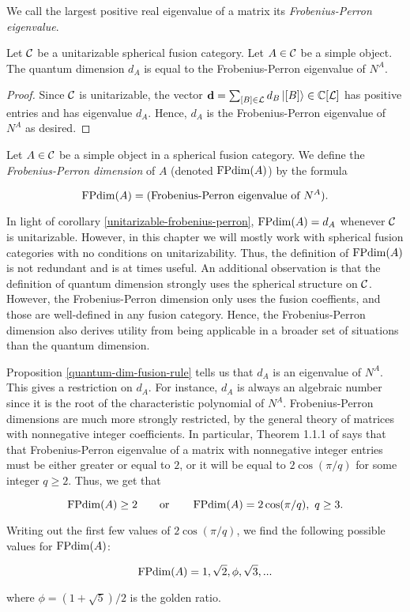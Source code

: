 \begin{defn}
We call the largest positive real eigenvalue of a matrix its {\em Frobenius-Perron eigenvalue}.
\end{defn}

\begin{cor}\label{unitarizable-frobenius-perron} Let ${\mathcal C}$ be a unitarizable spherical fusion category. Let $A\in {\mathcal C}$ be a simple object. The quantum dimension $d_A$ is equal to the Frobenius-Perron eigenvalue of $N^A$.
\end{cor}
\begin{proof} Since ${\mathcal C}$  is unitarizable, the vector $\bold{d} = \sum_{[B]\in {\mathcal L}} d_{B}\ket{[B]}\in {\mathbb C}[{\mathcal L}]$ has positive entries and has eigenvalue $d_A$. Hence, $d_A$ is the Frobenius-Perron eigenvalue of $N^A$ as desired.
\end{proof}

\begin{defn} Let $A\in{\mathcal C}$ be a simple object in a spherical fusion category. We define the {\em Frobenius-Perron dimension} of $A$ (denoted $\operatorname{FPdim}(A)$) by the formula

$$\operatorname{FPdim}(A)=(\text{Frobenius-Perron eigenvalue of $N^A$}).$$
\end{defn}

\begin{rem} In light of corollary \ref{unitarizable-frobenius-perron}, $\operatorname{FPdim}(A)=d_A$ whenever ${\mathcal C}$ is unitarizable. However, in this chapter we will mostly work with spherical fusion categories with no conditions on unitarizability. Thus, the definition of $\operatorname{FPdim}(A)$ is not redundant and is at times useful. An additional observation is that the definition of quantum dimension strongly uses the spherical structure on ${\mathcal C}$. However, the Frobenius-Perron dimension only uses the fusion coeffients, and those are well-defined in any fusion category. Hence, the Frobenius-Perron dimension also derives utility from being applicable in a broader set of situations than the quantum dimension.
\end{rem}

\begin{rem}
Proposition \ref{quantum-dim-fusion-rule} tells us that $d_A$ is an eigenvalue of $N^A$. This gives a restriction on $d_A$. For instance, $d_A$ is always an algebraic number since it is the root of the characteristic polynomial of $N^A$. Frobenius-Perron dimensions are much more strongly restricted, by the general theory of matrices with nonnegative integer coefficients. In particular, Theorem 1.1.1 of \cite{goodman2012coxeter} says that that Frobenius-Perron eigenvalue of a matrix with nonnegative integer entries must be either greater or equal to $2$, or it will be equal to $2\cos(\pi/q)$ for some integer $q\geq 2$. Thus, we get that

$$\operatorname{FPdim}(A)\geq 2 \qquad\text{or}\qquad\operatorname{FPdim}(A)=2\cos(\pi/q),\,\, q\geq 3.$$

Writing out the first few values of $2\cos(\pi/q)$, we find the following possible values for $\operatorname{FPdim}(A)$:

$$\operatorname{FPdim}(A)=1,\sqrt{2},\phi,\sqrt{3}, ...$$

where $\phi=(1+\sqrt{5})/2$ is the golden ratio. 
\end{rem}


